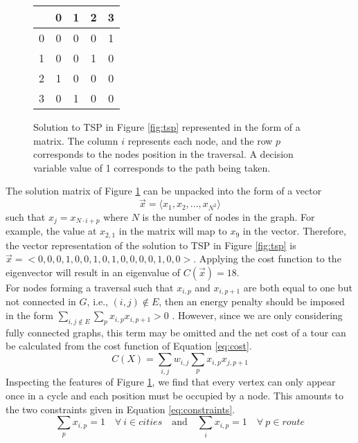 \begin{figure}[h]
	\begin{center}
		\begin{tabular}{c|cccc}
			\backslashbox{i}{p}&0 &1 &2 &3 \\
			\hline
			0& 0&0&0&1\\
			
			1& 0&0&1&0\\
			
			2& 1&0&0&0\\
			
			3& 0&1&0&0\\
		\end{tabular}
	\end{center}\caption{\doublespacing Solution to TSP in Figure \ref{fig:tsp} represented in the form of a matrix. The column $i$ represents each node, and the row $p$ corresponds to the nodes position in the traversal. A decision variable value of 1 corresponds to the path being taken.}\label{fig:matrix}
\end{figure}
The solution matrix of Figure \ref{fig:matrix} can be unpacked into the form of a vector 
\begin{equation}
	\vec{x} = \langle x_1, x_2, \dots, x_{N^2} \rangle
	\label{eq:vector}
\end{equation}
such that $x_j = x_{N \cdot i+p}$ where $N$ is the number of nodes in the graph. 
For example, the value at $x_{2,1}$ in the matrix will map to $x_9$ in the vector. Therefore, the vector representation of the solution to TSP in Figure \ref{fig:tsp} is $\vec{x} = <0,0,0,1,0,0,1,0,1,0,0,0,0,1,0,0>$. 
Applying the cost function to the eigenvector will result in an eigenvalue of $C(\vec{x}) = 18$.\\

For nodes forming a traversal such that $x_{i,p}$ and $x_{i,p+1}$ are both equal to one but not connected in $G$, i.e., $(i,j)\notin E$, then an energy penalty should be imposed in the form $\sum_{i,j \notin E}\sum_p x_{i,p}x_{i,p+1}>0$ \cite{lucas2014ising}.
However, since we are only considering fully connected graphs, this term may be omitted and the net cost of a tour can be calculated from the cost function of Equation \ref{eq:cost}.
\begin{equation}
	C(X)=\sum_{i,j}w_{i,j} \sum_p x_{i,p}x_{j,p+1} 
	\label{eq:cost}
\end{equation}
Inspecting the features of Figure \ref{fig:matrix}, we find that every vertex can only appear once in a cycle and each position must be occupied by a node. 
This amounts to the two constraints given in Equation \ref{eq:constraints}.
\begin{equation}
	\sum_p x_{i,p}=1 \quad \forall \: i \in cities \quad \text{and} \quad \sum_i x_{i,p}=1 \quad \forall \: p \in route
	\label{eq:constraints}
\end{equation}

